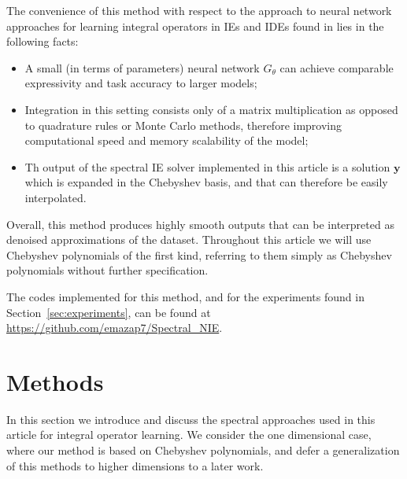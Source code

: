 \documentclass[11pt,fleqn]{amsart} %
\begin{document}
	The convenience of this method with respect to the approach to neural network approaches for learning integral operators in IEs and IDEs found in \cite{ANIE,ANIE_NAT,NIDE} lies in the following facts:
	\begin{itemize}
		\item 
		A small (in terms of parameters) neural network $G_\theta$ can achieve comparable expressivity and task accuracy to larger models;
		\item 
		Integration in this setting consists only of a matrix multiplication as opposed to quadrature rules or Monte Carlo methods, therefore improving computational speed and memory scalability of the model;
		\item 
		Th output of the spectral IE solver implemented in this article is a solution $\mathbf y$ which is expanded in the Chebyshev basis, and that can therefore be easily interpolated. 
	\end{itemize} 
	Overall, this method produces highly smooth outputs that can be interpreted as denoised approximations of the dataset. Throughout this article we will use Chebyshev polynomials of the first kind, referring to them simply as Chebyshev polynomials without further specification. 
	
	The codes implemented for this method, and for the experiments found in Section~\ref{sec:experiments}, can be found at \url{https://github.com/emazap7/Spectral_NIE}.
	
	
	\section{Methods}\label{sec:Mehtods}
	
	In this section we introduce and discuss the spectral approaches used in this article for integral operator learning. We consider the one dimensional case, where our method is based on Chebyshev polynomials, and defer a generalization of this methods to higher dimensions to a later work. 
	
\end{document}

